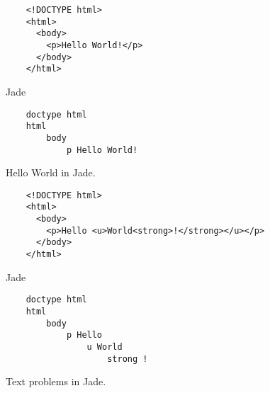 \begin{figure}[ht!]
    \large{}\normalsize{}
    \begin{verbatim}
    <!DOCTYPE html>
    <html>
      <body>
        <p>Hello World!</p>
      </body>
    </html>
    \end{verbatim}
    \large{Jade}\normalsize{}
    \begin{verbatim}
    doctype html
    html
        body
            p Hello World!
    \end{verbatim}
    \caption{Hello World in Jade.}
    \label{fig:JadeHelloWorld}
\end{figure}

\begin{figure}[ht!]
    \large{}\normalsize{}
    \begin{verbatim}
    <!DOCTYPE html>
    <html>
      <body>
        <p>Hello <u>World<strong>!</strong></u></p>
      </body>
    </html>
    \end{verbatim}
    \large{Jade}\normalsize{}
    \begin{verbatim}
    doctype html
    html
        body
            p Hello
                u World
                    strong !
    \end{verbatim}
    \caption{Text problems in Jade.}
    \label{fig:JadeProblem}
\end{figure}



